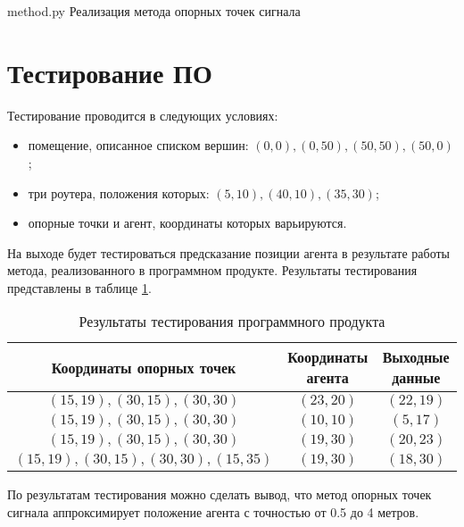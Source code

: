     {method.py}
    {Реализация метода опорных точек сигнала}

\clearpage

\section{Тестирование ПО}

Тестирование проводится в следующих условиях:

\begin{itemize}[label=---]
    \item помещение, описанное списком вершин: $(0, 0), (0, 50), (50, 50), (50, 0)$;
    \item три роутера, положения которых: $(5, 10), (40, 10), (35, 30)$;
    \item опорные точки и агент, координаты которых варьируются.
\end{itemize}

На выходе будет тестироваться предсказание позиции агента в результате работы метода, реализованного в программном продукте. Результаты тестирования представлены в таблице \ref{tab:test}.

\begin{table}[H]
    \caption{Результаты тестирования программного продукта}
    \label{tab:test}
    \centering
    \begin{tabular}{|c|c|c|}
        \hline
        Координаты опорных точек & Координаты агента & Выходные данные \\
        \hline
        $(15, 19), (30, 15), (30, 30)$ & $(23, 20)$ & $(22, 19)$ \\
        \hline
        $(15, 19), (30, 15), (30, 30)$ & $(10, 10)$ & $(5, 17)$ \\
        \hline
        $(15, 19), (30, 15), (30, 30)$ & $(19, 30)$ & $(20, 23)$ \\
        \hline
        $(15, 19), (30, 15), (30, 30), (15, 35)$ & $(19, 30)$ & $(18, 30)$ \\
        \hline
    \end{tabular}
\end{table}

По результатам тестирования можно сделать вывод, что метод опорных точек сигнала аппроксимирует положение агента с точностью от 0.5 до 4 метров.
